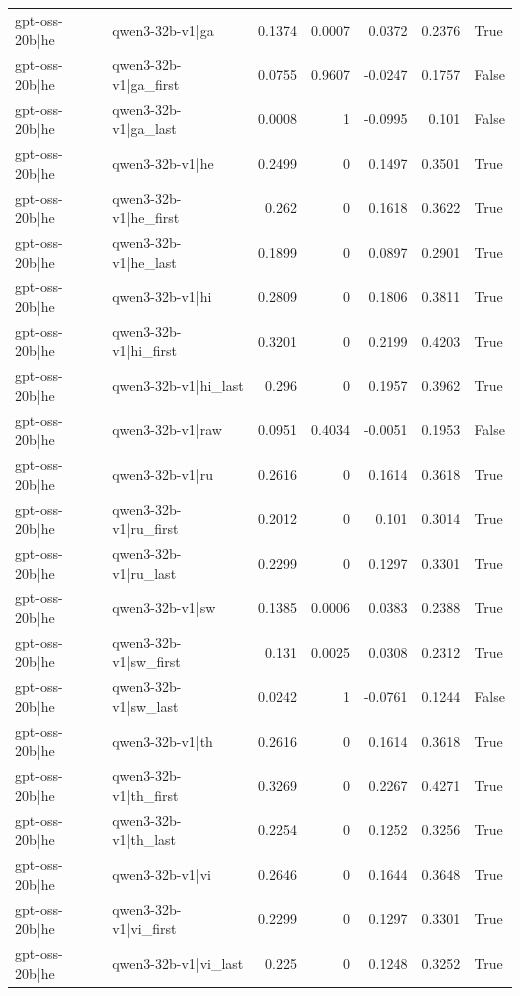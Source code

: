 \begin{table}
\begin{tabular}{l l r r r r l}
gpt-oss-20b|he & qwen3-32b-v1|ga & 0.1374 & 0.0007 & 0.0372 & 0.2376 & True \\
gpt-oss-20b|he & qwen3-32b-v1|ga_first & 0.0755 & 0.9607 & -0.0247 & 0.1757 & False \\
gpt-oss-20b|he & qwen3-32b-v1|ga_last & 0.0008 & 1 & -0.0995 & 0.101 & False \\
gpt-oss-20b|he & qwen3-32b-v1|he & 0.2499 & 0 & 0.1497 & 0.3501 & True \\
gpt-oss-20b|he & qwen3-32b-v1|he_first & 0.262 & 0 & 0.1618 & 0.3622 & True \\
gpt-oss-20b|he & qwen3-32b-v1|he_last & 0.1899 & 0 & 0.0897 & 0.2901 & True \\
gpt-oss-20b|he & qwen3-32b-v1|hi & 0.2809 & 0 & 0.1806 & 0.3811 & True \\
gpt-oss-20b|he & qwen3-32b-v1|hi_first & 0.3201 & 0 & 0.2199 & 0.4203 & True \\
gpt-oss-20b|he & qwen3-32b-v1|hi_last & 0.296 & 0 & 0.1957 & 0.3962 & True \\
gpt-oss-20b|he & qwen3-32b-v1|raw & 0.0951 & 0.4034 & -0.0051 & 0.1953 & False \\
gpt-oss-20b|he & qwen3-32b-v1|ru & 0.2616 & 0 & 0.1614 & 0.3618 & True \\
gpt-oss-20b|he & qwen3-32b-v1|ru_first & 0.2012 & 0 & 0.101 & 0.3014 & True \\
gpt-oss-20b|he & qwen3-32b-v1|ru_last & 0.2299 & 0 & 0.1297 & 0.3301 & True \\
gpt-oss-20b|he & qwen3-32b-v1|sw & 0.1385 & 0.0006 & 0.0383 & 0.2388 & True \\
gpt-oss-20b|he & qwen3-32b-v1|sw_first & 0.131 & 0.0025 & 0.0308 & 0.2312 & True \\
gpt-oss-20b|he & qwen3-32b-v1|sw_last & 0.0242 & 1 & -0.0761 & 0.1244 & False \\
gpt-oss-20b|he & qwen3-32b-v1|th & 0.2616 & 0 & 0.1614 & 0.3618 & True \\
gpt-oss-20b|he & qwen3-32b-v1|th_first & 0.3269 & 0 & 0.2267 & 0.4271 & True \\
gpt-oss-20b|he & qwen3-32b-v1|th_last & 0.2254 & 0 & 0.1252 & 0.3256 & True \\
gpt-oss-20b|he & qwen3-32b-v1|vi & 0.2646 & 0 & 0.1644 & 0.3648 & True \\
gpt-oss-20b|he & qwen3-32b-v1|vi_first & 0.2299 & 0 & 0.1297 & 0.3301 & True \\
gpt-oss-20b|he & qwen3-32b-v1|vi_last & 0.225 & 0 & 0.1248 & 0.3252 & True \\

\end{tabular}
\end{table}
